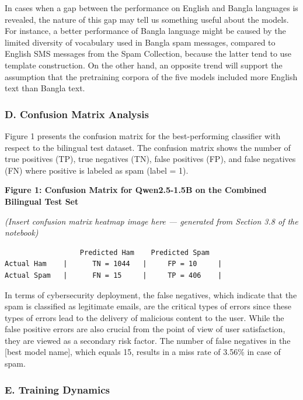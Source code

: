 In cases when a gap between the performance on English and Bangla
languages is revealed, the nature of this gap may tell us something
useful about the models. For instance, a better performance of Bangla
language might be caused by the limited diversity of vocabulary used in
Bangla spam messages, compared to English SMS messages from the Spam
Collection, because the latter tend to use template construction. On the
other hand, an opposite trend will support the assumption that the
pretraining corpora of the five models included more English text than
Bangla text.

\subsubsection{D. Confusion Matrix
Analysis}\label{d.-confusion-matrix-analysis}

Figure 1 presents the confusion matrix for the best-performing
classifier with respect to the bilingual test dataset. The confusion
matrix shows the number of true positives (TP), true negatives (TN),
false positives (FP), and false negatives (FN) where positive is labeled
as spam (label = 1).

\textbf{Figure 1: Confusion Matrix for Qwen2.5-1.5B on the Combined
Bilingual Test Set}

\emph{(Insert confusion matrix heatmap image here --- generated from
Section 3.8 of the notebook)}

\begin{verbatim}
                  Predicted Ham    Predicted Spam
Actual Ham    |      TN = 1044   |     FP = 10     |
Actual Spam   |      FN = 15     |     TP = 406    |
\end{verbatim}

In terms of cybersecurity deployment, the false negatives, which
indicate that the spam is classified as legitimate emails, are the
critical types of errors since these types of errors lead to the
delivery of malicious content to the user. While the false positive
errors are also crucial from the point of view of user satisfaction,
they are viewed as a secondary risk factor. The number of false
negatives in the {[}best model name{]}, which equals 15, results in a
miss rate of 3.56\% in case of spam.

\subsubsection{E. Training Dynamics}\label{e.-training-dynamics}


